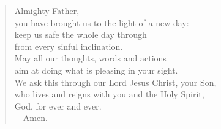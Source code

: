 \prayer

\setlength{\vleftmargin}{\prayerleftmargini}

\begin{verse}
Almighty Father,\\
you have brought us to the light of a new day:\\
keep us safe the whole day through\\
from every sinful inclination.\\
May all our thoughts, words and actions\\
aim at doing what is pleasing in your sight.\\
We ask this through our Lord Jesus Christ, your Son,\\
who lives and reigns with you and the Holy Spirit,\\
God, for ever and ever.\\
{\color{red}---\thinspace}Amen.
\end{verse}

\setlength{\vleftmargin}{\defleftmargini}